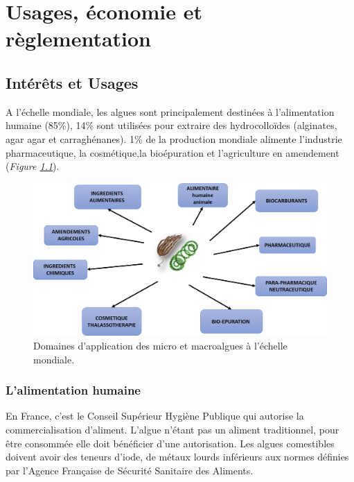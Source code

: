 \documentclass[
]{book}
\begin{document}
\hypertarget{usage}{%
\chapter{Usages, économie et règlementation}\label{usage}}

\hypertarget{intuxe9ruxeats-et-usages}{%
\section{Intérêts et Usages}\label{intuxe9ruxeats-et-usages}}

A l'échelle mondiale, les algues sont principalement destinées à l'alimentation humaine (85\%), 14\% sont utilisées pour extraire des hydrocolloïdes (alginates, agar agar et carraghénanes). 1\% de la production mondiale alimente l'industrie pharmaceutique, la cosmétique,la bioépuration et l'agriculture en amendement (\emph{Figure \ref{fig:application}}).

\begin{figure}

{\centering \includegraphics{images/application} 

}

\caption{Domaines d'application des micro et macroalgues à l'échelle mondiale.}\label{fig:application}
\end{figure}

\hypertarget{lalimentation-humaine}{%
\subsection{L'alimentation humaine}\label{lalimentation-humaine}}

En France, c'est le Conseil Supérieur Hygiène Publique qui autorise la commercialisation d'aliment. L'algue n'étant pas un aliment traditionnel, pour être consommée elle doit bénéficier d'une autorisation. Les algues comestibles doivent avoir des teneurs d'iode, de métaux lourds inférieurs aux normes définies par l'Agence Française de Sécurité Sanitaire des Aliments.
\end{document}

